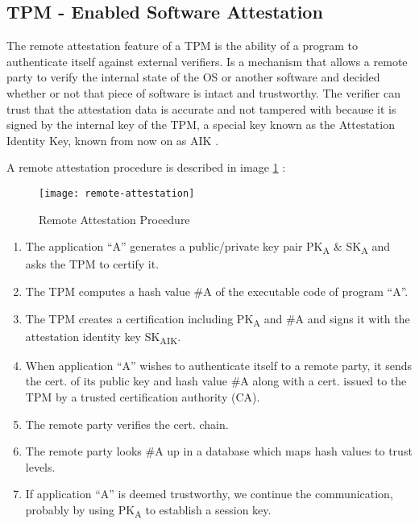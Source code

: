 \subsection{TPM - Enabled Software Attestation} %
\label{ssec:enabled _software_attestation}

The remote attestation feature of a \gls{TPM} is the ability of a program to authenticate itself against external verifiers. Is a mechanism that allows a remote party to verify the internal state of the OS or another software and decided whether or not that piece of software is intact and trustworthy. The verifier can trust that the attestation data is accurate and not tampered with because it is signed by the internal key of the \gls{TPM}, a special key known as the Attestation Identity Key, known from now on as \gls{AIK} \cite{attestation:aik}.

A remote attestation procedure is described in image \ref{fig:remote-attestation} \cite{attestation:1}: 

\begin{figure}[htbp]
	\centering
	{\texttt{[image: remote-attestation]}}%
	\caption{Remote Attestation Procedure}
	\label{fig:remote-attestation}
\end{figure}

\begin{enumerate}
	\item The application “A” generates a public/private key pair PK\textsubscript{A} \& SK\textsubscript{A} and asks the \gls{TPM} to certify it.
	\item The TPM computes a hash value \#A of the executable code of program “A”.
	\item The TPM creates a certification including PK\textsubscript{A} and \#A and signs it with the attestation identity key SK\textsubscript{AIK}.
	\item When application “A” wishes to authenticate itself to a remote party, it sends the cert. of its public key and hash value \#A along with a cert. issued to the TPM by a trusted certification authority (\gls{CA}).
	\item The remote party verifies the cert. chain.
	\item The remote party looks \#A up in a database which maps hash values to trust levels.
	\item If application “A” is deemed trustworthy, we continue the communication,
	probably by using PK\textsubscript{A} to establish a session key.
\end{enumerate}

